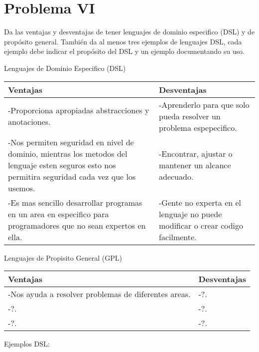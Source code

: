 \documentclass{article}
\begin{document}
\section*{Problema VI}
Da las ventajas y desventajas de tener lenguajes de dominio especifico (DSL)
y de propósito general. También da al menos tres ejemplos de lenguajes DSL,
cada ejemplo debe indicar el propósito del DSL y un ejemplo documentando su uso.
\\
\begin{center}
Lenguajes de Dominio Especifico (DSL)
\end{center}
\begin{tabularx}{\textwidth}{X|X}
	  \textbf{Ventajas} & \textbf{Desventajas} \\
	\hline
	-Proporciona apropiadas abstracciones y anotaciones. & -Aprenderlo para que solo pueda resolver un problema espepecifico.\\
	-Nos permiten seguridad en nivel de dominio, mientras los metodos del lenguaje esten seguros esto nos permitira seguridad cada vez que los usemos. & -Encontrar, ajustar o mantener un alcance adecuado.\\
	-Es mas sencillo desarrollar programas en un area en especifico para programadores que no sean expertos en ella. & -Gente no experta en el lenguaje no puede modificar o crear codigo facilmente.\\
\end{tabularx}

\begin{center}
Lenguajes de Propisito General (GPL)
\end{center}
\begin{tabularx}{\textwidth}{X|X}
	  \textbf{Ventajas} & \textbf{Desventajas} \\
	\hline
	-Nos ayuda a resolver problemas de diferentes areas. & -?.\\
	-?. & -?.\\
	-?. & -?.\\
\end{tabularx}
\begin{center}
Ejemplos DSL:
\end{center}
\end{document}
